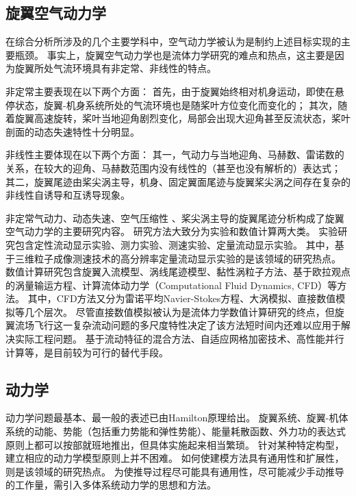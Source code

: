 \subsection{旋翼空气动力学}
在综合分析所涉及的几个主要学科中，空气动力学被认为是制约上述目标实现的主要瓶颈。
事实上，旋翼空气动力学也是流体力学研究的难点和热点，这主要是因为旋翼所处气流环境具有非定常、非线性的特点。

非定常主要表现在以下两个方面：
首先，由于旋翼始终相对机身运动，即使在悬停状态，旋翼-机身系统所处的气流环境也是随桨叶方位变化而变化的；
其次，随着旋翼高速旋转，桨叶当地迎角剧烈变化，局部会出现大迎角甚至反流状态，桨叶剖面的动态失速特性十分明显。

非线性主要体现在以下两个方面：
其一，气动力与当地迎角、马赫数、雷诺数的关系，在较大的迎角、马赫数范围内没有线性的（甚至也没有解析的）表达式；
其二，旋翼尾迹由桨尖涡主导，机身、固定翼面尾迹与旋翼桨尖涡之间存在复杂的非线性自诱导和互诱导现象。

非定常气动力、动态失速、空气压缩性 、桨尖涡主导的旋翼尾迹分析构成了旋翼空气动力学的主要研究内容。
研究方法大致分为实验和数值计算两大类。
实验研究包含定性流动显示实验、测力实验、测速实验、定量流动显示实验。
其中，基于三维粒子成像测速技术的高分辨率定量流动显示实验的是该领域的研究热点。
数值计算研究包含旋翼入流模型、涡线尾迹模型、黏性涡粒子方法、基于欧拉观点的涡量输运方程、计算流体动力学（Computational Fluid Dynamics, CFD）等方法。
其中，CFD方法又分为雷诺平均Navier-Stokes方程、大涡模拟、直接数值模拟等几个层次。
尽管直接数值模拟被认为是流体力学数值计算研究的终点，但旋翼流场飞行这一复杂流动问题的多尺度特性决定了该方法短时间内还难以应用于解决实际工程问题。
基于流动特征的混合方法、自适应网格加密技术、高性能并行计算等，是目前较为可行的替代手段。

\subsection{动力学}
动力学问题最基本、最一般的表述已由Hamilton原理给出。
%
旋翼系统、旋翼-机体系统的动能、势能（包括重力势能和弹性势能）、能量耗散函数、外力功的表达式原则上都可以按部就班地推出，但具体实施起来相当繁琐。
针对某种特定构型，建立相应的动力学模型原则上并不困难。
如何使建模方法具有通用性和扩展性，则是该领域的研究热点。
为使推导过程尽可能具有通用性，尽可能减少手动推导的工作量，需引入多体系统动力学的思想和方法。

